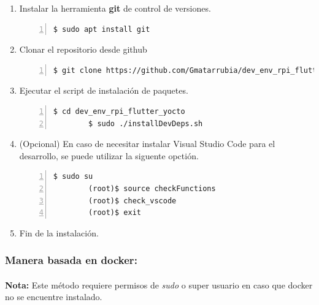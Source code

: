 \begin{enumerate}
    \item Instalar la herramienta \textbf{\gls{git}} de control de versiones.
    \begin{lstlisting}[style=consola, numbers=left]
        $ sudo apt install git
    \end{lstlisting}

    \item Clonar el repositorio desde github
    \begin{lstlisting}[style=consola, numbers=left]
        $ git clone https://github.com/Gmatarrubia/dev_env_rpi_flutter_yocto.git
    \end{lstlisting}

    \item Ejecutar el script de instalación de paquetes.
    \begin{lstlisting}[style=consola, numbers=left]
        $ cd dev_env_rpi_flutter_yocto
        $ sudo ./installDevDeps.sh
    \end{lstlisting}

    \item (Opcional) En caso de necesitar instalar Visual Studio Code para el desarrollo,
    se puede utilizar la siguente opctión.
    \begin{lstlisting}[style=consola, numbers=left]
        $ sudo su
        (root)$ source checkFunctions
        (root)$ check_vscode
        (root)$ exit
    \end{lstlisting}

    \item Fin de la instalación.
\end{enumerate}


\subsubsection{Manera basada en docker:}

\paragraph{}\textbf{Nota:} Este método requiere permisos de \emph{sudo} o super usuario
en caso que docker no se encuentre instalado.

